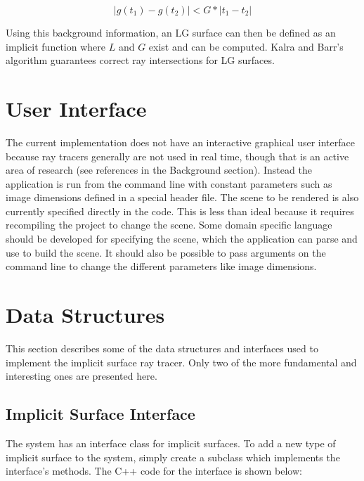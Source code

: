 \documentclass[conference]{acmsiggraph}
\begin{document}
\begin{equation}
\label{eq:G}
|g(t_1) - g(t_2)| < G * |t_1 - t_2|
\end{equation}

Using this background information, an LG surface can
then be defined as an implicit function where $L$ and $G$ exist and can be
computed.  Kalra and Barr's algorithm guarantees correct ray intersections
for LG surfaces.

\section{User Interface}

The current implementation does not have an interactive graphical user 
interface because ray tracers generally are not used in real time,
though that is an active area of research (see references in the Background
section).  Instead the application is run from the command line with constant 
parameters such as image dimensions defined in a special header file.
The scene to be rendered is also currently specified directly in the 
code.  This is less than ideal because it requires recompiling the project to 
change the scene.  Some domain specific language should be developed
for specifying the scene, which the application can parse and
use to build the scene.  It should also be possible to pass arguments
on the command line to change the different parameters like
image dimensions.

\section{Data Structures}

This section describes some of the data structures and interfaces 
used to implement the implicit surface ray tracer.  Only two of the 
more fundamental and interesting ones are presented here.

\subsection{Implicit Surface Interface}

The system has an interface class for implicit surfaces.  To add a new
type of implicit surface to the system, simply create a subclass
which implements the interface's methods.  The C++ code for the interface
is shown below:
\end{document}
